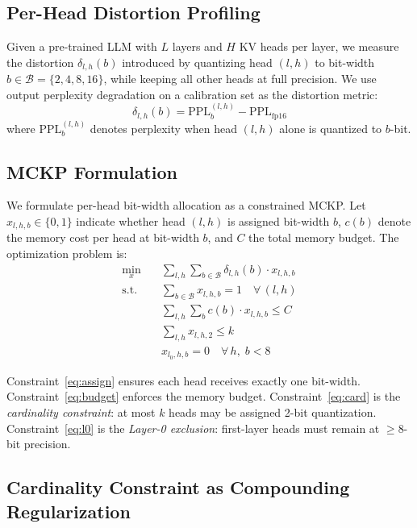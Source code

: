 \documentclass[11pt]{article}
\begin{document}
\subsection{Per-Head Distortion Profiling}

Given a pre-trained LLM with $L$ layers and $H$ KV heads per layer, we measure the distortion $\delta_{l,h}(b)$ introduced by quantizing head $(l,h)$ to bit-width $b \in \mathcal{B} = \{2, 4, 8, 16\}$, while keeping all other heads at full precision.
We use output perplexity degradation on a calibration set as the distortion metric:
\begin{equation}
  \delta_{l,h}(b) = \text{PPL}_{b}^{(l,h)} - \text{PPL}_{\text{fp16}}
\end{equation}
where $\text{PPL}_{b}^{(l,h)}$ denotes perplexity when head $(l,h)$ alone is quantized to $b$-bit.

\subsection{MCKP Formulation}

We formulate per-head bit-width allocation as a constrained MCKP.
Let $x_{l,h,b} \in \{0,1\}$ indicate whether head $(l,h)$ is assigned bit-width $b$, $c(b)$ denote the memory cost per head at bit-width $b$, and $C$ the total memory budget.
The optimization problem is:
\begin{align}
  \min_{x} \quad & \sum_{l,h} \sum_{b \in \mathcal{B}} \delta_{l,h}(b) \cdot x_{l,h,b} \label{eq:obj} \\
  \text{s.t.} \quad & \sum_{b \in \mathcal{B}} x_{l,h,b} = 1 \quad \forall\, (l,h) \label{eq:assign} \\
  & \sum_{l,h} \sum_{b} c(b) \cdot x_{l,h,b} \leq C \label{eq:budget} \\
  & \sum_{l,h} x_{l,h,2} \leq k \label{eq:card} \\
  & x_{l_0, h, b} = 0 \quad \forall\, h,\; b < 8 \label{eq:l0}
\end{align}

Constraint~\eqref{eq:assign} ensures each head receives exactly one bit-width.
Constraint~\eqref{eq:budget} enforces the memory budget.
Constraint~\eqref{eq:card} is the \emph{cardinality constraint}: at most $k$ heads may be assigned 2-bit quantization.
Constraint~\eqref{eq:l0} is the \emph{Layer-0 exclusion}: first-layer heads must remain at $\geq$8-bit precision.

\subsection{Cardinality Constraint as Compounding Regularization}
\end{document}

